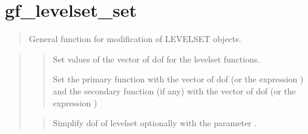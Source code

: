 \documentclass[a4paper,11pt,english]{sphinxmanual}
\begin{document}
\section{gf\_levelset\_set}
\label{\detokenize{matlab_octave/cmdref_gf_levelset_set:gf-levelset-set}}\label{\detokenize{matlab_octave/cmdref_gf_levelset_set::doc}}
\sphinxAtStartPar
{}

\begin{sphinxVerbatim}[commandchars=\\\{\}]
     \PYG{p}{[}   \PYG{p}{]}
  \PYG{p}{[}  \PYG{p}{]}
\end{sphinxVerbatim}

\sphinxAtStartPar
{}
\begin{quote}

\sphinxAtStartPar
General function for modification of LEVELSET objects.
\end{quote}

\sphinxAtStartPar
{}
\begin{quote}

\sphinxAtStartPar
{}
\begin{quote}

\sphinxAtStartPar
Set values of the vector of dof for the level\sphinxhyphen{}set functions.

\sphinxAtStartPar
Set the primary function with the vector of dof  (or the expression
) and the secondary function (if any) with  the vector of dof
 (or the expression )
\end{quote}

\sphinxAtStartPar
{}
\begin{quote}

\sphinxAtStartPar
Simplify dof of level\sphinxhyphen{}set optionally with the parameter .
\end{quote}
\end{quote}
\end{document}
